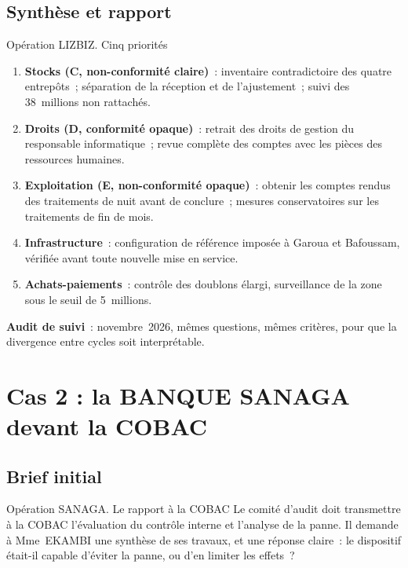 \subsection{Synthèse et rapport}

\begin{boxscenario}{Opération LIZBIZ. Cinq priorités}
\begin{enumerate}
    \item \textbf{Stocks (C, non-conformité claire)}~: inventaire
          contradictoire des quatre entrepôts~; séparation de la réception
          et de l'ajustement~; suivi des 38~millions non rattachés.
    \item \textbf{Droits (D, conformité opaque)}~: retrait des droits de
          gestion du responsable informatique~; revue complète des comptes
          avec les pièces des ressources humaines.
    \item \textbf{Exploitation (E, non-conformité opaque)}~: obtenir les
          comptes rendus des traitements de nuit avant de conclure~;
          mesures conservatoires sur les traitements de fin de mois.
    \item \textbf{Infrastructure}~: configuration de référence imposée à
          Garoua et Bafoussam, vérifiée avant toute nouvelle mise en
          service.
    \item \textbf{Achats-paiements}~: contrôle des doublons élargi,
          surveillance de la zone sous le seuil de 5~millions.
\end{enumerate}
\textbf{Audit de suivi}~: novembre~2026, mêmes questions, mêmes critères,
pour que la divergence entre cycles soit interprétable.
\end{boxscenario}

\section{Cas 2 : la BANQUE SANAGA devant la COBAC}
\label{sec:c26-sanaga}

\subsection{Brief initial}

\begin{boxscenario}{Opération SANAGA. Le rapport à la COBAC}
Le comité d'audit doit transmettre à la COBAC l'évaluation du contrôle
interne et l'analyse de la panne. Il demande à Mme~EKAMBI une synthèse de
ses travaux, et une réponse claire~: le dispositif était-il capable
d'éviter la panne, ou d'en limiter les effets~?
\end{boxscenario}

